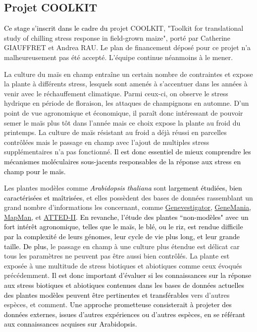 \documentclass[twoside]{article}
\newcommand{\AR}[1]{\textcolor{black}{#1}}
\begin{document}
\newpage
    \subsection{Projet COOLKIT}

\vspace{0.5cm}\AR{Ce stage s'inscrit dans le cadre du} projet COOLKIT, "Toolkit for translational study of chilling stress response in field-grown maize", porté par Catherine GIAUFFRET et Andrea RAU. Le plan de financement déposé pour ce projet n'a malheureusement pas été accepté. L'équipe continue néanmoins à le mener.
   
\vspace{0.5cm}La culture du maïs en champ entraîne un certain nombre  de contraintes et expose la plante à différents stress, lesquels sont amenés à s'accentuer dans les années à venir avec le réchauffement climatique. Parmi ceux-ci, on observe le stress hydrique en période de floraison, les attaques de champignons en automne. D'un point de vue agronomique et économique, il paraît donc intéressant de pouvoir semer le maïs plus tôt dans l'année mais ce choix expose la plante au froid du printemps. La culture de maïs résistant au froid a déjà réussi en parcelles contrôlées mais le passage en champ avec l'ajout de multiples stress supplémentaires n'a pas fonctionné. \AR{Il est donc essentiel de mieux comprendre les mécanismes moléculaires sous-jacents responsables de la réponse aux stress en champ pour le maïs.}

\vspace{0.5cm}Les plantes modèles comme \AR{{\it Arabidopsis thaliana}} sont \AR{largement étudiées, bien caractérisées et maîtrisées}, et elles possèdent des bases de données rassemblant un grand nombre d'informations les concernant, comme \href{https://genevestigator.com/}{\underline{Genevestigator}}, \href{https://genemania.org/}{\underline{GeneMania}}, \href{https://mapman.gabipd.org/}{\underline{MapMan}}, et \href{https://atted.jp/}{\underline{ATTED-II}}. \AR{En revanche, l'étude des plantes ``non-modèles" avec un fort intérêt agronomique, telles que le maïs, le blé, ou le riz, est rendue difficile par la complexité de leurs génomes, leur cycle de vie plus long, et leur grande taille. De plus,} le passage en champ à une culture plus étendue est délicat car tous les paramètres ne peuvent pas être aussi bien contrôlés. La plante est exposée à une multitude de stress biotiques et abiotiques comme ceux évoqués précédemment. \AR{Il est donc important d'évaluer si les connaissances sur la réponse aux stress biotiques et abiotiques contenues dans les bases de données actuelles des plantes modèles peuvent être pertinentes et transférables} vers d'autres espèces, et comment. \AR{Une approche prometteuse consisterait à projeter des données externes, issues d'autres expériences ou d'autres espèces, en se référant aux connaissances acquises sur Arabidopsis.} 
\end{document}
